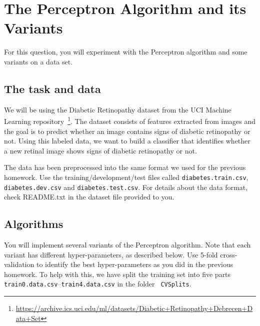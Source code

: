 \section{The Perceptron Algorithm and its Variants}\label{sec:q4}

For this question, you will experiment with the Perceptron algorithm
and some variants on a data set.

\subsection{The task and data}

We will be using the Diabetic Retinopathy dataset from the UCI
Machine Learning
repository~\footnote{\url{https://archive.ics.uci.edu/ml/datasets/Diabetic+Retinopathy+Debrecen+Data+Set}}. The
dataset consists of features extracted from images and the goal is
to predict whether an image contains signs of diabetic retinopathy
or not. Using this labeled data, we want to build a classifier that
identifies whether a new retinal image shows signs of diabetic
retinopathy or not.

The data has been preprocessed into the same format we used for the previous homework.  Use the
training/development/test files called {\tt diabetes.train.csv}, {\tt
  diabetes.dev.csv} and {\tt diabetes.test.csv}.  For details about the data format, check README.txt in the dataset file provided to you.
\subsection{Algorithms}

You will implement several variants of the Perceptron algorithm. Note
that each variant has different hyper-parameters, as described
below. Use 5-fold cross-validation to identify the best
hyper-parameters as you did in the previous homework. To help with
this, we have split the training set into five parts {\tt
  train0.data.csv}--{\tt train4.data.csv} in the folder {\tt
  CVSplits}.

